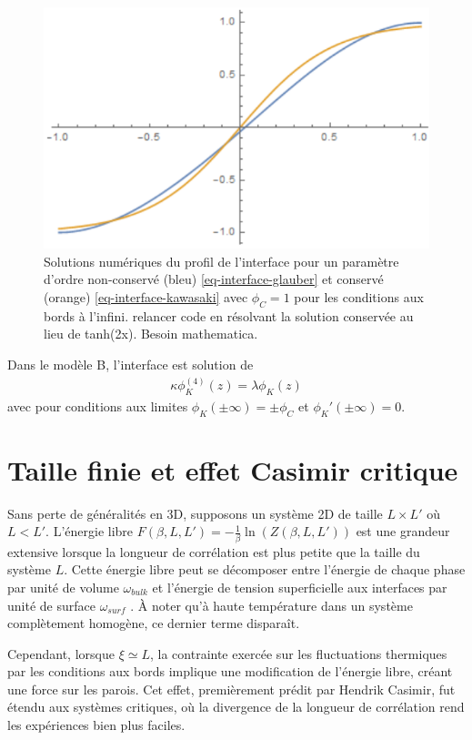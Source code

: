 \begin{figure}
    \centering
    \includegraphics[width=0.5\linewidth]{intro/profil-KawVsGlau.png}
    \caption{Solutions numériques du profil de l'interface pour un paramètre d'ordre non-conservé (bleu) \ref{eq-interface-glauber} et conservé (orange) \ref{eq-interface-kawasaki} avec $\phi_C = 1$  pour  les conditions aux bords à l'infini. {\color{red} relancer code en résolvant la solution conservée au lieu de tanh(2x). Besoin mathematica.}}
\end{figure}

Dans le modèle B, l'interface est solution de 
\begin{align}
    \kappa \phi_K^{(4)}(z) = \lambda \phi_K(z) 
    \label{eq-interface-kawasaki}
\end{align}
avec pour conditions aux limites $\phi_K(\pm \infty) = \pm \phi_C$ et $\phi_K'(\pm \infty) = 0$.



    \section{Taille finie et effet Casimir critique}
    
Sans perte de généralités en 3D, supposons un système 2D de taille $L \times L' $ où $L \less L'$. L'énergie libre $F(\beta,L,L') = - \frac{1}{\beta} \ln ( Z(\beta,L,L'))$ est une grandeur extensive lorsque la longueur de corrélation est plus petite que la taille du système $L$. 
Cette énergie libre peut se décomposer entre l'énergie de chaque phase par unité de volume $\omega_{bulk}$ et l'énergie de tension superficielle aux interfaces par unité de surface $\omega_{surf}$ \cite{cardozo_finite_2015,lopes_cardozo_critical_2014}. À noter qu'à haute température dans un système complètement homogène, ce dernier terme disparaît.

Cependant, lorsque $\xi \simeq L$, la contrainte exercée sur les fluctuations thermiques par les conditions aux bords implique une modification de l'énergie libre, créant une force sur les parois. Cet effet, premièrement prédit par Hendrik Casimir\cite{h_b_g_casimir_attraction_1948}, fut étendu aux systèmes critiques\cite{nikolic_is_2017}, où la divergence de la longueur de corrélation rend les expériences bien plus faciles\cite{nguyen_controlling_2013}.

